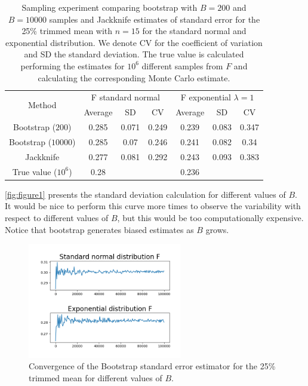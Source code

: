 \documentclass[a4paper,10pt, notitlepage]{report}
\begin{document}
\begin{table}[htb]
  \centering
  \begin{tabular}{ccccccc}
  \hline
  \multirow{2}{*}{Method} & \multicolumn{3}{c}{F standard normal} & \multicolumn{3}{c}{F exponential $\lambda = 1$} \\ \cline{2-7} 
   & Average & SD & CV & Average & SD & CV \\ \hline
  Bootstrap ($200$) & 0.285 & 0.071 & 0.249 & 0.239 & 0.083 & 0.347 \\
  Bootstrap ($10000$) & 0.285 & 0.07 & 0.246 & 0.241 & 0.082 & 0.34 \\
  Jackknife & 0.277 & 0.081 & 0.292 & 0.243 & 0.093 & 0.383 \\
  True value ($10^6$) & 0.28 &  &  & 0.236 &  &  \\ \hline
  \end{tabular}
  \caption{\label{tab:table1}Sampling experiment comparing bootstrap with
  $B=200$ and $B=10000$ samples and Jackknife estimates of standard error for
  the 25\% trimmed mean with $n=15$ for the standard normal and exponential
  distribution. We denote CV for the coefficient of variation and SD the
  standard deviation. The true value is calculated performing the estimates
  for $10^6$ different samples from $F$ and calculating the corresponding
  Monte Carlo estimate.}
\end{table}

\autoref{fig:figure1} presents the standard deviation calculation for different values of
$B$. It would be nice to perform this curve more times to observe the
variability with respect to different values of $B$, but this would be too
computationally expensive.  Notice that bootstrap generates biased estimates as $B$ grows.

\begin{figure}[htb]
  \centering
  \includegraphics[width=0.6\textwidth]{different_values_B.png}
  \caption{\label{fig:figure1}Convergence of the Bootstrap standard error
  estimator for the 25\% trimmed mean for different values of $B$.}
\end{figure}
\end{document}
